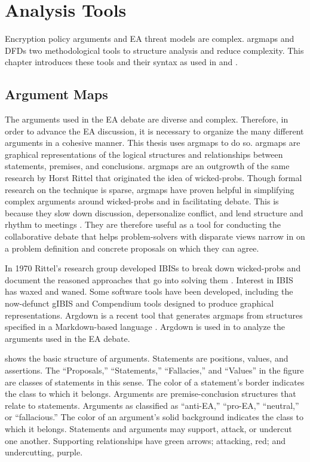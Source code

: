 \chapter{Analysis Tools}
\label{chap-tools}

Encryption policy arguments and \acl{EA} threat models are complex. \Acp{argmap} and \aclp{DFD} two methodological tools
to structure analysis and reduce complexity. This chapter introduces these tools and their syntax as used in
 and .


\section{Argument Maps}
\label{sec-arg-maps-intro}

The arguments used in the \ac{EA} debate are diverse and complex. Therefore, in order to advance the \ac{EA} discussion,
it is necessary to organize the many different arguments in a cohesive manner. This thesis uses \acp{argmap} to do so.
\Acp{argmap} are graphical representations of the logical structures and relationships between statements, premises, and
conclusions. \Acp{argmap} are an outgrowth of the same research by Horst Rittel that originated the idea of
\acp{wicked-prob}. Though formal research on the technique is sparse, \acp{argmap} have proven helpful in simplifying
complex arguments around \acp{wicked-prob} \cite{renton_2007} and in facilitating debate. This is because they slow down
discussion, depersonalize conflict, and lend structure and rhythm to meetings \cite{dutoit_hypermedia_2006}. They are
therefore useful as a tool for conducting the collaborative debate that helps problem-solvers with disparate views
narrow in on a problem definition and concrete proposals on which they can agree.

In 1970 Rittel's research group developed \acp{IBIS} to break down \acp{wicked-prob} and document the reasoned
approaches that go into solving them \cite{kunz_issues_1970}. Interest in \ac{IBIS} has waxed and waned. Some software
tools have been developed, including the now-defunct gIBIS \cite{conklin_gibis_1988} and Compendium
\cite{dutoit_hypermedia_2006} tools designed to produce graphical representations. Argdown is a recent tool that
generates \acp{argmap} from structures specified in a Markdown-based language \cite{voigt_argdown_2018}. Argdown is used
in  to analyze the arguments used in the \ac{EA} debate.

 shows the basic structure of arguments. Statements are positions, values, and assertions. The
``Proposals,'' ``Statements,'' ``Fallacies,'' and ``Values'' in the figure are classes of statements in this sense. The
color of a statement's border indicates the class to which it belongs. Arguments are premise-conclusion structures that
relate to statements. Arguments as classified as ``anti-EA,'' ``pro-EA,'' ``neutral,'' or ``fallacious.'' The color of
an argument's solid background indicates the class to which it belongs. Statements and arguments may support, attack, or
undercut one another. Supporting relationships have green arrows; attacking, red; and undercutting, purple.

